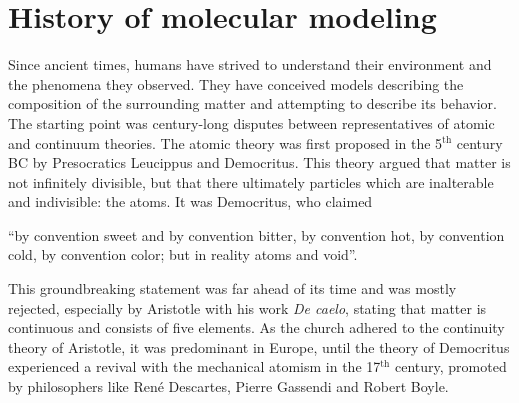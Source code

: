 \section{History of molecular modeling}

Since ancient times, humans have strived to understand their environment
and the phenomena they observed.
%
They have conceived models describing the composition of the surrounding matter
and attempting to describe its behavior.
%
The starting point was
century-long disputes between representatives %
of atomic and continuum theories. The atomic theory was first proposed\cite{MA83.6} in the 5$^{\mathrm{th}}$ century BC
by Presocratics Leucippus and Democritus. This theory argued that matter is not
infinitely divisible, but that there ultimately
particles which are
inalterable and indivisible: the atoms.
%
It was Democritus, who claimed\cite{DI51.1,TA99.1}
%
\begin{displayquote}
``by convention sweet and by convention bitter, by convention hot, by convention cold, by convention color; but in reality atoms and void''.
\end{displayquote}
%
This groundbreaking statement was far ahead of its time and was mostly rejected, especially
by Aristotle with his work \textit{De caelo}, stating that matter is continuous and consists
of five elements.\cite{ST30.1} As the church 
adhered to the continuity theory of Aristotle, 
it was predominant in Europe, until the 
theory of Democritus
experienced a revival 
with 
the mechanical atomism in the 17$^{\mathrm{th}}$ century, promoted by philosophers 
like Ren\'e Descartes, Pierre Gassendi and Robert Boyle.\cite{CH09.22}

